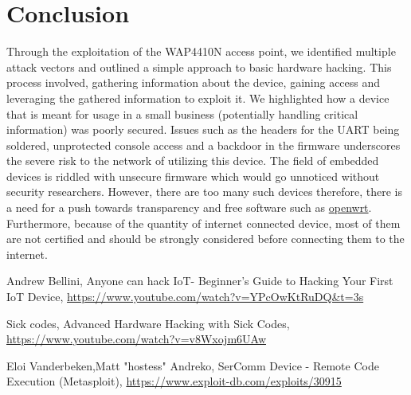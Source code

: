 \documentclass{article}
\begin{document}
\section{Conclusion}
Through the exploitation of the WAP4410N access point, we identified multiple attack vectors and outlined a simple approach to basic hardware hacking. This process involved, gathering information about the device, gaining access and leveraging the gathered information to exploit it. We highlighted how a device that is meant for usage in a small business (potentially handling critical information) was poorly secured. Issues such as the headers for the UART being soldered, unprotected console access and a backdoor in the firmware underscores the severe risk to the network of utilizing this device. The field of embedded devices is riddled with unsecure firmware which would go unnoticed without security researchers. However, there are too many such devices therefore, there is a need for a push towards transparency and free software such as \href{https://openwrt.org/}{openwrt}. Furthermore, because of the quantity of internet connected device, most of them are not certified and should be strongly considered before connecting them to the internet.
\begin{thebibliography}

	Andrew Bellini,
	Anyone can hack IoT- Beginner’s Guide to Hacking Your First IoT Device,
	\url{https://www.youtube.com/watch?v=YPcOwKtRuDQ&t=3s}

	Sick codes, 
	Advanced Hardware Hacking with Sick Codes,
	\url{https://www.youtube.com/watch?v=v8Wxojm6UAw}

	Eloi Vanderbeken,Matt "hostess" Andreko,
	SerComm Device - Remote Code Execution (Metasploit),
	\url{https://www.exploit-db.com/exploits/30915}
\end{thebibliography}
\end{document}
